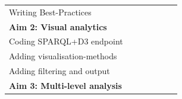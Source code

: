 \documentclass[twoside,fontsize=12pt]{article}
\begin{document}
\begin{table}[h]
\begin{center}
\begin{tabular}{lllllll}
\hspace*{1em} Writing Best-Practices            &                                                 &                                                  \cellcolor[HTML]{656565}             &           &                                                 &                                                                                                  &                                                                                                \\
\textbf{Aim 2: Visual analytics}                &                                                 &                                                  \cellcolor[HTML]{343434}                        & \cellcolor[HTML]{343434}                        &                                                                                                                        &                                                 \\
\hspace*{1em} Coding SPARQL+D3 endpoint         &                                                 &                                                  \cellcolor[HTML]{656565}                        &                                                 &                                                                                                 &                                                 &                                                 \\
\hspace*{1em} Adding visualisation-methods      &                                                                                               & \cellcolor[HTML]{656565}                        & \cellcolor[HTML]{656565}                                                                         &                                                 &                                                 &                                                 \\
\hspace*{1em} Adding filtering and output                                                                                           &                                                 &  &                                                \cellcolor[HTML]{656565}   &                                                 &                                                 &                                                 \\
\textbf{Aim 3: Multi-level analysis}            &                                                                                                  &                                                 &  & \cellcolor[HTML]{343434}{\color[HTML]{343434} } & \cellcolor[HTML]{343434}{\color[HTML]{343434} } & \cellcolor[HTML]{343434}{\color[HTML]{343434} } \\

\end{tabular}
\end{center}
\end{table}
\end{document}
